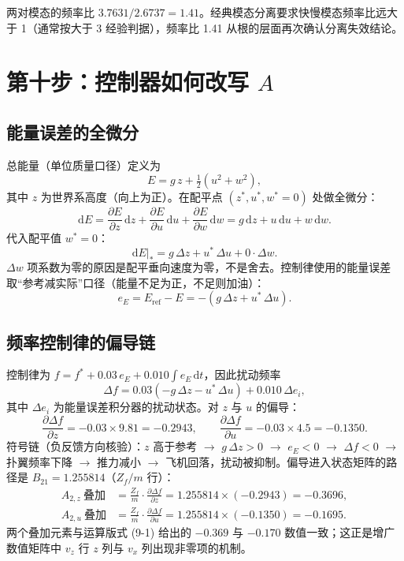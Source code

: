 \documentclass[11pt,a4paper]{ctexart}
\newcommand{\dd}{\mathrm{d}}
\begin{document}
两对模态的频率比 $3.7631/2.6737=1.41$。经典模态分离要求快慢模态频率比远大于 1（通常按大于 3 经验判据），频率比 1.41 从根的层面再次确认分离失效结论。

\section{第十步：控制器如何改写 \texorpdfstring{$A$}{A}}\label{sec:control}

\subsection{能量误差的全微分}

总能量（单位质量口径）定义为
\[
E = g\,z + \tfrac{1}{2}\left(u^2+w^2\right),
\]
其中 $z$ 为世界系高度（向上为正）。在配平点 $(z^{*},u^{*},w^{*}=0)$ 处做全微分：
\[
\dd E = \frac{\partial E}{\partial z}\,\dd z + \frac{\partial E}{\partial u}\,\dd u + \frac{\partial E}{\partial w}\,\dd w
= g\,\dd z + u\,\dd u + w\,\dd w.
\]
代入配平值 $w^{*}=0$：
\[
\left.\dd E\right|_{*} = g\,\Delta z + u^{*}\,\Delta u + 0\cdot\Delta w.
\]
$\Delta w$ 项系数为零的原因是配平垂向速度为零，不是舍去。控制律使用的能量误差取“参考减实际”口径（能量不足为正，不足则加油）：
\begin{equation}\label{eq:10-1}
e_E = E_{\mathrm{ref}} - E = -\left(g\,\Delta z + u^{*}\,\Delta u\right).
\tag{(10-1)}
\end{equation}

\subsection{频率控制律的偏导链}

控制律为 $f = f^{*} + 0.03\,e_E + 0.010\int e_E\,\dd t$，因此扰动频率
\[
\Delta f = 0.03\left(-g\,\Delta z - u^{*}\,\Delta u\right) + 0.010\,\Delta e_i,
\]
其中 $\Delta e_i$ 为能量误差积分器的扰动状态。对 $z$ 与 $u$ 的偏导：
\[
\frac{\partial\Delta f}{\partial z} = -0.03\times 9.81 = -0.2943,
\qquad
\frac{\partial\Delta f}{\partial u} = -0.03\times 4.5 = -0.1350.
\]
符号链（负反馈方向核验）：$z$ 高于参考 $\to$ $g\,\Delta z>0$ $\to$ $e_E<0$ $\to$ $\Delta f<0$ $\to$ 扑翼频率下降 $\to$ 推力减小 $\to$ 飞机回落，扰动被抑制。偏导进入状态矩阵的路径是 $B_{21}=1.255814$（$Z_f/m$ 行）：
\begin{align*}
A_{2,z}\ \text{叠加} &= \frac{Z_f}{m}\cdot\frac{\partial\Delta f}{\partial z} = 1.255814\times(-0.2943) = -0.3696,\\
A_{2,u}\ \text{叠加} &= \frac{Z_f}{m}\cdot\frac{\partial\Delta f}{\partial u} = 1.255814\times(-0.1350) = -0.1695.
\end{align*}
两个叠加元素与运算版式 (9-1) 给出的 $-0.369$ 与 $-0.170$ 数值一致；这正是增广数值矩阵中 $v_z$ 行 $z$ 列与 $v_x$ 列出现非零项的机制。
\end{document}
